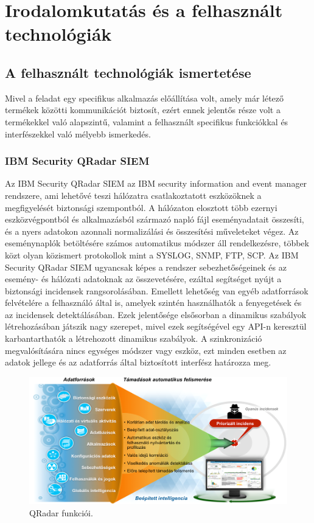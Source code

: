 \chapter{Irodalomkutatás és a felhasznált technológiák}
\label{ch:tech}
\section{A felhasznált technológiák ismertetése}
Mivel a feladat egy specifikus alkalmazás előállítása volt, amely már létező termékek közötti kommunikációt biztosít, ezért ennek jelentős része volt a termékekkel való alapszintű, valamint a felhasznált specifikus funkciókkal és interfészekkel való mélyebb ismerkedés.


\subsection{IBM Security QRadar SIEM}
\label{subsec:qradar}
Az IBM Security QRadar SIEM az IBM security information and event manager rendszere, ami lehetővé teszi hálózatra csatlakoztatott eszközöknek a megfigyelését biztonsági szempontból.\cite{qradardoc} A hálózaton elosztott több ezernyi eszközvégpontból és alkalmazásból származó napló fájl eseményadatait összesíti, és a nyers adatokon azonnali normalizálási és összesítési műveleteket végez. Az eseménynaplók betöltésére számos automatikus módszer áll rendelkezésre, többek közt olyan közismert protokollok mint a SYSLOG, SNMP, FTP, SCP. Az IBM Security QRadar SIEM ugyancsak képes a rendszer sebezhetőségeinek és az esemény- és hálózati adatoknak az összevetésére, ezáltal segítséget nyújt a biztonsági incidensek rangsorolásában. Emellett lehetőség van egyéb adatforrások felvételére a felhasználó által is, amelyek szintén használhatók a fenyegetések és az incidensek detektálásában. Ezek jelentősége elsősorban a dinamikus szabályok létrehozásában játszik nagy szerepet, mivel ezek segítségével egy API-n keresztül karbantarthatók a létrehozott dinamikus szabályok. A szinkronizáció megvalósítására nincs egységes módszer vagy eszköz, ezt minden esetben az adatok jellege és az adatforrás által biztosított interfész határozza meg.

\begin{figure}
	\centering
	\includegraphics[width=0.9\linewidth]{figures/QRadar_promo.png}
	\caption{QRadar funkciói.}
	\label{fig:qradar-promo}
\end{figure}

